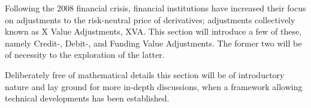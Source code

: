 \documentclass[main.tex]{subfiles}
\begin{document}
    Following the 2008 financial crisis,
    financial institutions have increased their focus on 
    adjustments to the risk-neutral price of derivatives;
    adjustments collectively known as X Value Adjustments, XVA.
    This section will introduce a few of these, 
    namely Credit-, Debit-, and Funding Value Adjustments.
    The former two will be of necessity to the exploration of the latter.

    Deliberately free of mathematical details this section will be of introductory nature 
    and lay ground for more in-depth discussions, 
    when a framework allowing technical developments has been established.
\end{document}
